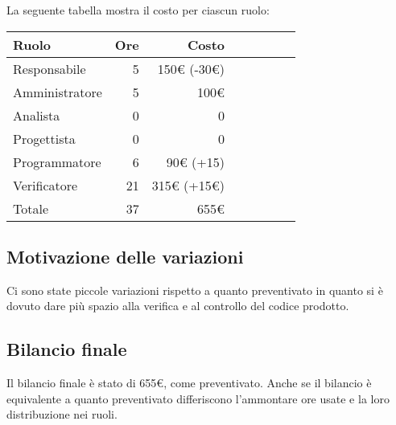 La seguente tabella mostra il costo per ciascun ruolo:
\begin{table}[ht]
    \begin{tabularx}{\linewidth}{X|rrrrrrr}
    \rowcolor{gray!30}Ruolo & Ore & Costo \\
    \hline
    Responsabile                            & 5    & 150€ (-30€)\\
    \rowcolor{gray!10}Amministratore        & 5    & 100€  \\
    Analista                                & 0    & 0\\
    \rowcolor{gray!10}Progettista           & 0    & 0\\
    Programmatore                           & 6    & 90€ (+15) \\
    \rowcolor{gray!10}Verificatore          & 21   & 315€ (+15€) \\
    \hline Totale                           & 37   & 655€\\ 
    \end{tabularx}
\end{table}

\subsection{Motivazione delle variazioni}
Ci sono state piccole variazioni rispetto a quanto preventivato in quanto si è dovuto dare più spazio alla verifica e al controllo del codice prodotto.

\subsection{Bilancio finale}
Il bilancio finale è stato di 655€, come preventivato. Anche se il bilancio è equivalente a quanto preventivato differiscono l'ammontare ore usate e la loro distribuzione nei ruoli.